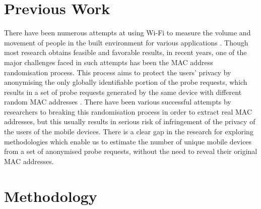 \documentclass[11t, a4paper, twocolumn]{article}
\begin{document}
	\section{Previous Work}\label{prev}
		There have been numerous attempts at using Wi-Fi to measure the volume and movement of people in the built environment for various applications \citep{zarim2006,sap2015,reki2007}. Though most research obtains feasible and favorable results, in recent years, one of the major challenges faced in such attempts has been the MAC address randomisation process. This process aims to protect the users’ privacy by anonymising the only globally identifiable portion of the probe requests, which results in a set of probe requests generated by the same device with different random MAC addresses \citep{green2008}. There have been various successful attempts by researchers to breaking this randomisation process in order to extract real MAC addresses, \citep{martin2017} but this usually results in serious risk of infringement of the privacy of the users of the mobile devices. There is a clear gap in the research for exploring methodologies which enable us to estimate the number of unique mobile devices from a set of anonymised probe requests, without the need to reveal their original MAC addresses.
	\section{Methodology}
\end{document}
